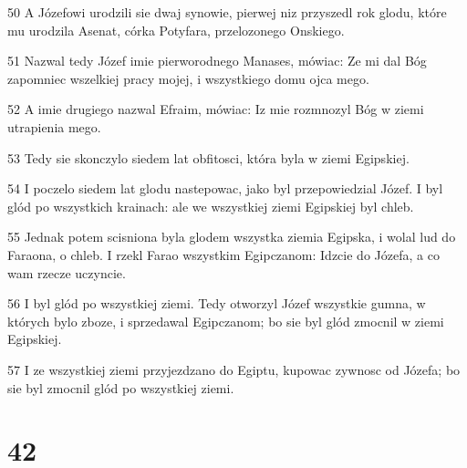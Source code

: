 \par 50 A Józefowi urodzili sie dwaj synowie, pierwej niz przyszedl rok glodu, które mu urodzila Asenat, córka Potyfara, przelozonego Onskiego.
\par 51 Nazwal tedy Józef imie pierworodnego Manases, mówiac: Ze mi dal Bóg zapomniec wszelkiej pracy mojej, i wszystkiego domu ojca mego.
\par 52 A imie drugiego nazwal Efraim, mówiac: Iz mie rozmnozyl Bóg w ziemi utrapienia mego.
\par 53 Tedy sie skonczylo siedem lat obfitosci, która byla w ziemi Egipskiej.
\par 54 I poczelo siedem lat glodu nastepowac, jako byl przepowiedzial Józef. I byl glód po wszystkich krainach: ale we wszystkiej ziemi Egipskiej byl chleb.
\par 55 Jednak potem scisniona byla glodem wszystka ziemia Egipska, i wolal lud do Faraona, o chleb. I rzekl Farao wszystkim Egipczanom: Idzcie do Józefa, a co wam rzecze uczyncie.
\par 56 I byl glód po wszystkiej ziemi. Tedy otworzyl Józef wszystkie gumna, w których bylo zboze, i sprzedawal Egipczanom; bo sie byl glód zmocnil w ziemi Egipskiej.
\par 57 I ze wszystkiej ziemi przyjezdzano do Egiptu, kupowac zywnosc od Józefa; bo sie byl zmocnil glód po wszystkiej ziemi.

\chapter{42}

